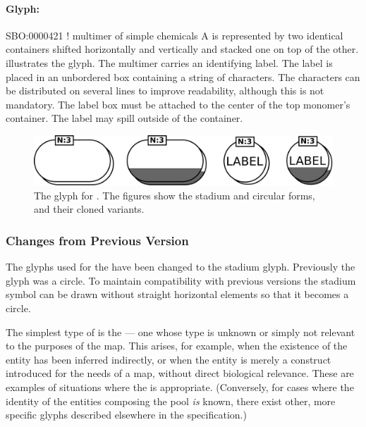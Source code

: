 \paragraph{Glyph: }

\begin{glyphDescription}
\glyphSboTerm SBO:0000421 ! multimer of simple chemicals
\glyphContainer  A  is represented by two identical containers shifted horizontally and vertically and stacked one on top of the other.   illustrates the glyph.
\glyphLabel The multimer carries an identifying label.  The label is placed in an unbordered box containing a string of characters.  The characters can be distributed on several lines to improve readability, although this is not mandatory.  The label box must be attached to the center of the top monomer's container.  The label may spill outside of the container.
\end{glyphDescription}

\begin{figure}[htb]
  \centering
  \includegraphics[scale = 0.3]{images/simpleChemicalMultimer}
  \caption{The \PD glyph for . The
    figures show the stadium and circular forms, and their cloned variants.}
  \label{fig:techref:simpleChemicalMultimer}
\end{figure}

\subsubsection{Changes from Previous Version}

The glyphs used for the  have been changed
to the stadium glyph. Previously the glyph was a circle. To maintain
compatibility with previous versions the stadium symbol can be drawn
without straight horizontal elements so that it becomes a circle.

\label{sec:techref:unspecifiedEntity}

The simplest type of  is the
 --- one whose type is unknown or simply
not relevant to the purposes of the map.  This arises, for example,
when the existence of the entity has been inferred indirectly, or when
the entity is merely a construct introduced for the needs of a map,
without direct biological relevance.  These are examples of situations
where the  is appropriate.  (Conversely,
for cases where the identity of the entities composing the pool
\emph{is} known, there exist other, more specific glyphs described
elsewhere in the specification.)

